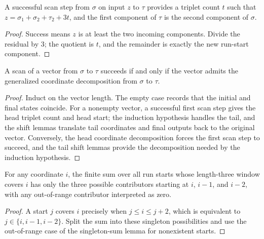 \begin{lemma}

  \label{lem:coord_of_scan_step}
  A successful scan step from \(\sigma\) on input \(z\) to \(\tau\)
  provides a triplet count \(t\) such that
  \(z=\sigma_1+\sigma_2+\tau_2+3t\), and the first component of
  \(\tau\) is the second component of \(\sigma\).
\end{lemma}
\begin{proof}

\leanok
  Success means \(z\) is at least the two incoming components.  Divide the
  residual by \(3\); the quotient is \(t\), and the remainder is exactly
  the new run-start component.
\end{proof}

\begin{lemma}

  \label{lem:scan_iff_scan_decomp}
  A scan of a vector from \(\sigma\) to \(\tau\) succeeds if and only if
  the vector admits the generalized coordinate decomposition from
  \(\sigma\) to \(\tau\).
\end{lemma}
\begin{proof}

\leanok
  Induct on the vector length.  The empty case records that the initial
  and final states coincide.  For a nonempty vector, a successful first
  scan step gives the head triplet count and head start; the induction
  hypothesis handles the tail, and the shift lemmas translate tail
  coordinates and final outputs back to the original vector.  Conversely,
  the head coordinate decomposition forces the first scan step to succeed,
  and the tail shift lemmas provide the decomposition needed by the
  induction hypothesis.
\end{proof}

\begin{lemma}

  \label{lem:run_cover_at}
  For any coordinate \(i\), the finite sum over all run starts whose
  length-three window covers \(i\) has only the three possible
  contributors starting at \(i\), \(i-1\), and \(i-2\), with any
  out-of-range contributor interpreted as zero.
\end{lemma}
\begin{proof}

\leanok
  A start \(j\) covers \(i\) precisely when \(j\leq i\leq j+2\), which is
  equivalent to \(j\in\{i,i-1,i-2\}\).  Split the sum into these singleton
  possibilities and use the out-of-range case of the singleton-sum lemma
  for nonexistent starts.
\end{proof}

